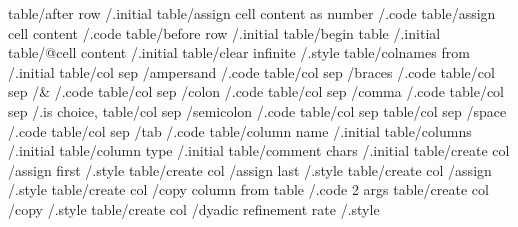 table/after row                                                                 /.initial     
table/assign cell content as number                                             /.code        
table/assign cell content                                                       /.code        
table/before row                                                                /.initial     
table/begin table                                                               /.initial     
table/@cell content                                                             /.initial     
table/clear infinite                                                            /.style       
table/colnames from                                                             /.initial     
table/col sep                      /ampersand                                   /.code        
table/col sep                      /braces                                      /.code        
table/col sep                      /&                                           /.code        
table/col sep                      /colon                                       /.code        
table/col sep                      /comma                                       /.code        
table/col sep                                                                   /.is choice,  
table/col sep                      /semicolon                                   /.code        
table/col sep                      
table/col sep                      /space                                       /.code        
table/col sep                      /tab                                         /.code        
table/column name                                                               /.initial     
table/columns                                                                   /.initial     
table/column type                                                               /.initial     
table/comment chars                                                             /.initial     
table/create col                   /assign first                                /.style       
table/create col                   /assign last                                 /.style       
table/create col                   /assign                                      /.style       
table/create col                   /copy column from table                      /.code 2 args 
table/create col                   /copy                                        /.style       
table/create col                   /dyadic refinement rate                      /.style       

